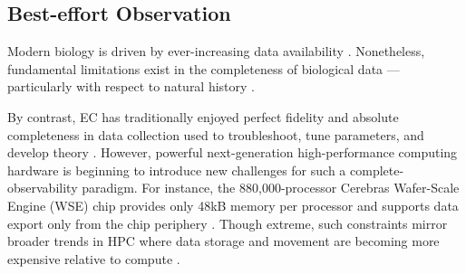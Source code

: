 \subsection{Best-effort Observation}
\label{sec:best-effort}

Modern biology is driven by ever-increasing data availability \citep{strasser2012data,sulston1983embryonic,sheth2017multiplex,weeks2022deep}.
Nonetheless, fundamental limitations exist in the completeness of biological data --- particularly with respect to natural history \citep{benton2011assessing,delsuc2005phylogenomics}.

By contrast, EC has traditionally enjoyed perfect fidelity and absolute completeness in data collection used to troubleshoot, tune parameters, and develop theory \citep{hernandez2023suite,hooker1995testing,oneil2003digital,lenski2003evolutionary}.
However, powerful next-generation high-performance computing hardware \citep{zhang2016cambricon,emani2021accelerating,jia2019dissecting,medina2020habana,lauterbach2021path,vanessendelft2025record} is beginning to introduce new challenges for such a complete-observability paradigm.
For instance, the 880,000-processor Cerebras Wafer-Scale Engine (WSE) chip provides only 48kB memory per processor and supports data export only from the chip periphery \citep{miyajima2025benchmarking,he2025wafer,vanessendelft2025system}.
Though extreme, such constraints mirror broader trends in HPC where data storage and movement are becoming more expensive relative to compute \citep{buluc2021randomized,khan2021analysis,gholami2024ai,klasky2021data}.

